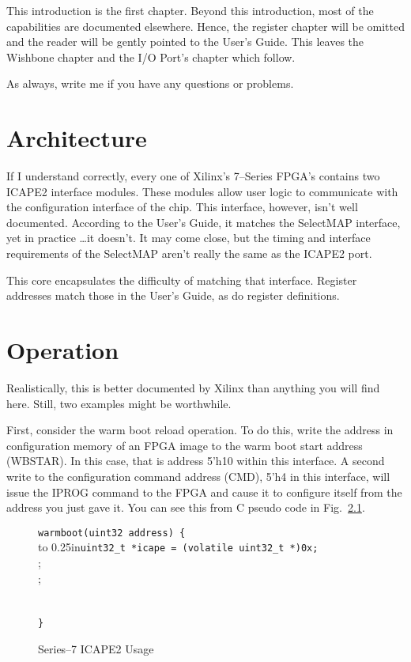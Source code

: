 \documentclass{gqtekspec}
\begin{document}
This introduction is the first chapter.  Beyond this introduction, most
of the capabilities are documented elsewhere.  Hence, the register chapter
will be omitted and the reader will be gently pointed to the User's Guide.
This leaves the Wishbone chapter and the I/O Port's chapter which follow.

As always, write me if you have any questions or problems.

\chapter{Architecture}\label{chap:arch}

If I understand correctly, every one of Xilinx's 7--Series FPGA's contains
two ICAPE2 interface modules.  These modules allow user logic to communicate
with the configuration interface of the chip.  This interface, however, isn't
well documented.  According to the User's Guide, it matches the SelectMAP
interface, yet in practice \ldots it doesn't.  It may come close, but the
timing and interface requirements of the SelectMAP aren't really the same as the
ICAPE2 port.

This core encapsulates the difficulty of matching that interface.  Register
addresses match those in the User's Guide, as do register definitions.

\chapter{Operation}\label{chap:ops}

Realistically, this is better documented by Xilinx than anything you will find
here.  Still, two examples might be worthwhile.

First, consider the warm boot reload operation.  To do this, write the address
in configuration memory of an FPGA image to the warm boot start address
(WBSTAR).  In this case, that is address 5'h10 within this interface.  A second
write to the configuration command address (CMD), 5'h4 in this interface, will
issue the IPROG command to the FPGA and cause it to configure itself from the
address you just gave it.  You can see this from C pseudo code in
Fig.~\ref{fig:warmboot}.
\begin{figure}\begin{center}\begin{tabbing}
{\tt warmboot(uint32 address) \{} \\
\hbox to 0.25in{}\={\tt uint32\_t *icape = (volatile uint32\_t *)0x{\em <ICAPE port address>};}\\
 ;\\
 ;\\
 \\
 \\
{\tt \}}
\end{tabbing}
\caption{Series--7 ICAPE2 Usage}\label{fig:warmboot}
\end{center}\end{figure}
\end{document}

